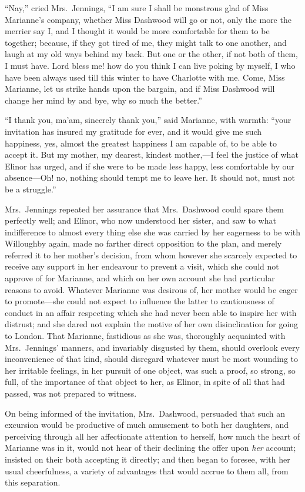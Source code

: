 ``Nay,'' cried Mrs.\ Jennings, ``I am sure I shall be
monstrous glad of Miss Marianne's company, whether Miss
Dashwood will go or not, only the more the merrier say I,
and I thought it would be more comfortable for them to
be together; because, if they got tired of me, they might talk
to one another, and laugh at my old ways behind my back.
But one or the other, if not both of them, I must have.
Lord bless me! how do you think I can live poking by myself,
I who have been always used till this winter to have
Charlotte with me.  Come, Miss Marianne, let us strike
hands upon the bargain, and if Miss Dashwood will change
her mind by and bye, why so much the better.''

``I thank you, ma'am, sincerely thank you,'' said Marianne,
with warmth: ``your invitation has insured my gratitude for ever,
and it would give me such happiness, yes, almost the greatest
happiness I am capable of, to be able to accept it.
But my mother, my dearest, kindest mother,---I feel the
justice of what Elinor has urged, and if she were to be
made less happy, less comfortable by our absence---Oh! no,
nothing should tempt me to leave her.  It should not,
must not be a struggle.''

Mrs.\ Jennings repeated her assurance that Mrs.\ Dashwood
could spare them perfectly well; and Elinor, who now
understood her sister, and saw to what indifference to
almost every thing else she was carried by her eagerness
to be with Willoughby again, made no farther direct
opposition to the plan, and merely referred it to her
mother's decision, from whom however she scarcely expected
to receive any support in her endeavour to prevent a visit,
which she could not approve of for Marianne, and which
on her own account she had particular reasons to avoid.
Whatever Marianne was desirous of, her mother would be eager
to promote---she could not expect to influence the latter
to cautiousness of conduct in an affair respecting which she
had never been able to inspire her with distrust; and she
dared not explain the motive of her own disinclination
for going to London.  That Marianne, fastidious as she was,
thoroughly acquainted with Mrs.\ Jennings' manners,
and invariably disgusted by them, should overlook every
inconvenience of that kind, should disregard whatever
must be most wounding to her irritable feelings, in her
pursuit of one object, was such a proof, so strong,
so full, of the importance of that object to her, as Elinor,
in spite of all that had passed, was not prepared to witness.

On being informed of the invitation, Mrs.\ Dashwood,
persuaded that such an excursion would be productive
of much amusement to both her daughters, and perceiving
through all her affectionate attention to herself,
how much the heart of Marianne was in it, would not hear
of their declining the offer upon \emph{her} account; insisted on
their both accepting it directly; and then began to foresee,
with her usual cheerfulness, a variety of advantages that
would accrue to them all, from this separation.

